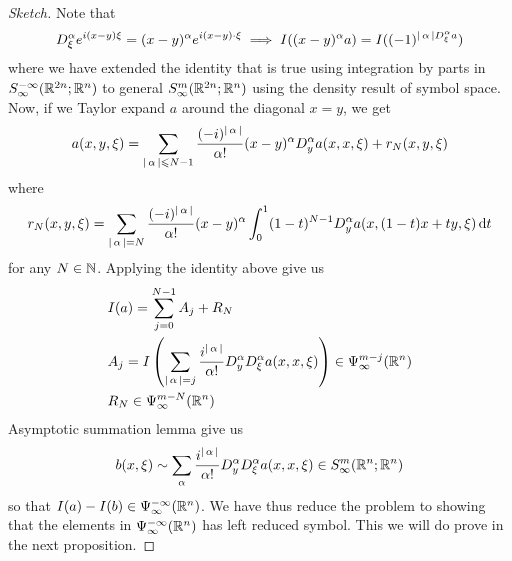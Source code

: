\documentclass[12pt]{article}
\begin{document}
\begin{proof}[Sketch] 
    Note that 
    \begin{align*}
        D_\xi^\alpha e^{i(x- y) \xi} = (x - y)^\alpha e^{i(x -y) \cdot \xi} \implies I((x -y)^\alpha a) = I((-1)^{\abs{\alpha}D_\xi^\alpha a})
    \end{align*}
    where we have extended the identity that is true using integration by parts in $S^{-\infty}_\infty(\R^{2n}; \R^n)$ to general $S^{m}_\infty(\R^{2n}; \R^n)$ using the density result of symbol space. Now, if we Taylor expand $a$ around the diagonal $x =y$, we get 
    \begin{align*}
        a(x, y, \xi) = \sum_{\abs{\alpha} \leq N -1} \frac{(-i)^{\abs{\alpha}}}{\alpha !} (x - y)^\alpha D^\alpha_ya (x, x, \xi) + r_N(x, y, \xi)
    \end{align*}
    where 
    \begin{align*}
        r_N(x, y, \xi) = \sum_{\abs{\alpha} = N} \frac{(-i)^{\abs{\alpha}}}{\alpha !} (x - y)^\alpha \int_0^1 (1 - t)^{N -1} D^\alpha_ya(x, (1 -t)x + ty, \xi) \d[t]
    \end{align*}
    for any $N \in \N$.  Applying the identity above give us 
    \begin{align*}
        &I(a) = \sum_{j = 0}^{N -1} A_j + R_N \\
        &A_j = I\brac{\sum_{\abs{\alpha} = j} \frac{i^{\abs{\alpha}}}{\alpha !} D^\alpha_y D^\alpha_\xi a (x, x, \xi)} \in \Psi^{m - j}_\infty(\R^n)\\
        &R_N \in \Psi^{m -N}_\infty(\R^n)
    \end{align*}
    Asymptotic summation lemma give us 
    \begin{align*}
        b(x, \xi) \sim \sum_{\alpha} \frac{i^{\abs{\alpha}}}{\alpha !} D^\alpha_y D^\alpha_\xi a (x, x, \xi) \in S^{m}_\infty(\R^{n}; \R^n)
    \end{align*}
    so that $I(a) - I(b) \in \Psi^{-\infty}_\infty(\R^n)$. We have thus reduce the problem to showing that the elements in $\Psi^{-\infty}_{\infty}(\R^n)$ has left reduced symbol. This we will do prove in the next proposition. 
    
\end{proof}
\end{document}

